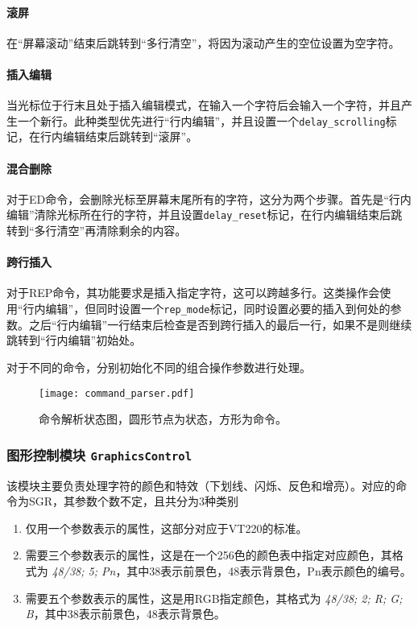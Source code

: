 \paragraph{滚屏}
在``屏幕滚动''结束后跳转到``多行清空''，将因为滚动产生的空位设置为空字符。

\paragraph{插入编辑}
当光标位于行末且处于插入编辑模式，在输入一个字符后会输入一个字符，并且产生一个新行。此种类型优先进行``行内编辑''，并且设置一个\texttt{delay\_scrolling}标记，在行内编辑结束后跳转到``滚屏''。

\paragraph{混合删除}
对于ED命令，会删除光标至屏幕末尾所有的字符，这分为两个步骤。首先是``行内编辑''清除光标所在行的字符，并且设置\texttt{delay\_reset}标记，在行内编辑结束后跳转到``多行清空''再清除剩余的内容。
\paragraph{跨行插入}
对于REP命令，其功能要求是插入指定字符，这可以跨越多行。这类操作会使用``行内编辑''，但同时设置一个\texttt{rep\_mode}标记，同时设置必要的插入到何处的参数。之后``行内编辑''一行结束后检查是否到跨行插入的最后一行，如果不是则继续跳转到``行内编辑''初始处。

对于不同的命令，分别初始化不同的组合操作参数进行处理。

\begin{landscape}
	\begin{figure}[htbp]
	\centerline{
	\texttt{[image: command\_parser.pdf]}
	}
	\caption{命令解析状态图，圆形节点为状态，方形为命令。}
	\label{fig:command_parser}
	\end{figure}
\end{landscape}


\subsubsection{图形控制模块 \texttt{GraphicsControl}}
该模块主要负责处理字符的颜色和特效（下划线、闪烁、反色和增亮）。对应的命令为SGR，其参数个数不定，且共分为3种类别
\begin{enumerate}
	\item 仅用一个参数表示的属性，这部分对应于VT220的标准。
	\item 需要三个参数表示的属性，这是在一个256色的颜色表中指定对应颜色，其格式为 {\it 48/38; 5; Pn}，其中38表示前景色，48表示背景色，Pn表示颜色的编号。
	\item 需要五个参数表示的属性，这是用RGB指定颜色，其格式为 {\it 48/38; 2; R; G; B}，其中38表示前景色，48表示背景色。
\end{enumerate}

